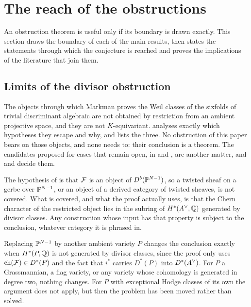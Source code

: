 \section{The reach of the obstructions}\label{sec:scope}

An obstruction theorem is useful only if its boundary is drawn exactly. This
section draws the boundary of each of the main results, then states the
statements through which the conjecture is reached and proves the
implications of the literature that join them.

\subsection{Limits of the divisor obstruction}

\begin{remark}\label{rem:markmanscope}
The objects through which Markman proves the Weil classes of the sixfolds of
trivial discriminant algebraic \cite{Mar25a,Mar25b} are not obtained by
restriction from an ambient projective space, and they are not
$K$-equivariant.  analyses exactly which hypotheses they
escape and why, and  lists the three. No obstruction
of this paper bears on those objects, and none needs to: their conclusion is
a theorem. The candidates proposed for cases that remain open, in
\cite[Section~12]{Mar25b} and \cite[Example~11.2.7]{Mar25c}, are another
matter, and  and 
decide them.
\end{remark}

\begin{remark}\label{rem:twisted}
The hypothesis of  is that $\mathcal{F}$ is an object of
$D^{b}(\mathbb{P}^{N-1})$, so a twisted sheaf on a gerbe over $\mathbb{P}^{N-1}$, or an
object of a derived category of twisted sheaves, is not covered. What is
covered, and what the proof actually uses, is that the Chern character of the
restricted object lies in the subring of $H^{*}(A^{\vee},\mathbb{Q})$ generated by
divisor classes. Any construction whose input has that property is subject to
the conclusion, whatever category it is phrased in.
\end{remark}

\begin{remark}\label{rem:otherambient}
Replacing $\mathbb{P}^{N-1}$ by another ambient variety $P$ changes the conclusion
exactly when $H^{*}(P,\mathbb{Q})$ is not generated by divisor classes, since the
proof only uses $\operatorname{ch}(\mathcal{F})\in D^{*}(P)$ and the fact that $i^{*}$ carries
$D^{*}(P)$ into $D^{*}(A^{\vee})$. For $P$ a Grassmannian, a flag variety, or any
variety whose cohomology is generated in degree two, nothing changes. For $P$
with exceptional Hodge classes of its own the argument does not apply, but
then the problem has been moved rather than solved.
\end{remark}


